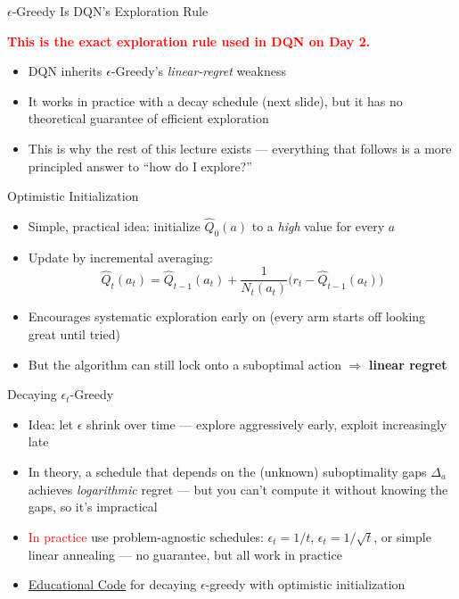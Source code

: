 \begin{frame}{$\epsilon$-Greedy Is DQN's Exploration Rule}
\vspace{0.5em}
\begin{center}
\textcolor{red}{\textbf{This is the exact exploration rule used in DQN on Day 2.}}
\end{center}
\vspace{1em}
\begin{itemize}
    \setlength{\itemsep}{0.6em}
    \item DQN inherits $\epsilon$-Greedy's \emph{linear-regret} weakness
    \item It works in practice with a decay schedule (next slide), but it has no theoretical guarantee of efficient exploration
    \item This is why the rest of this lecture exists --- everything that follows is a more principled answer to ``how do I explore?''
\end{itemize}
\end{frame}

\begin{frame}{Optimistic Initialization}
\begin{itemize}
    \setlength{\itemsep}{0.45em}
    \item Simple, practical idea: initialize $\hat{Q}_0(a)$ to a \emph{high} value for every $a$
    \item Update by incremental averaging:
    \[
        \hat{Q}_t(a_t) = \hat{Q}_{t-1}(a_t) + \frac{1}{N_t(a_t)} \big(r_t - \hat{Q}_{t-1}(a_t)\big)
    \]
    \item Encourages systematic exploration early on (every arm starts off looking great until tried)
    \item But the algorithm can still lock onto a suboptimal action $\Rightarrow$ \textbf{linear regret}
\end{itemize}
\end{frame}

\begin{frame}{Decaying $\epsilon_t$-Greedy}
\begin{itemize}
    \setlength{\itemsep}{0.65em}
    \item Idea: let $\epsilon$ shrink over time --- explore aggressively early, exploit increasingly late
    \item In theory, a schedule that depends on the (unknown) suboptimality gaps $\Delta_a$ achieves \emph{logarithmic} regret --- but you can't compute it without knowing the gaps, so it's impractical
    \item \textcolor{red}{In practice} use problem-agnostic schedules: $\epsilon_t = 1/t$, $\epsilon_t = 1/\sqrt{t}$, or simple linear annealing --- no guarantee, but all work in practice
    \item \href{https://github.com/TikhonJelvis/RL-book/blob/master/rl/chapter14/epsilon_greedy.py}{Educational Code} for decaying $\epsilon$-greedy with optimistic initialization
\end{itemize}
\end{frame}

